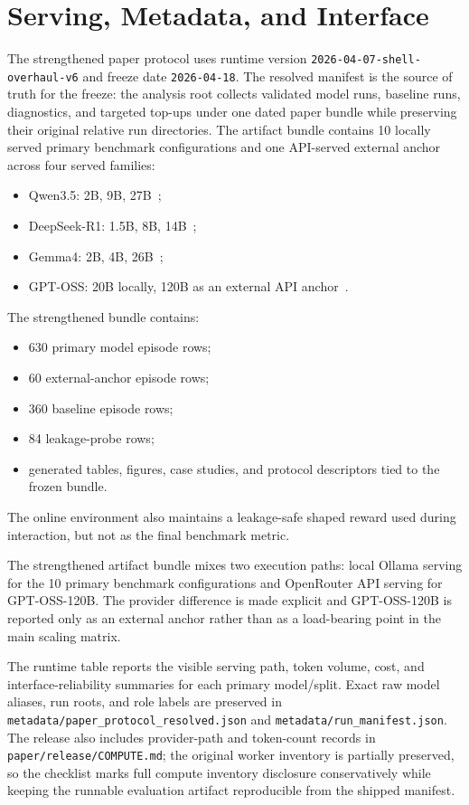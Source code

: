 \section{Serving, Metadata, and Interface}

The strengthened paper protocol uses runtime version
\texttt{2026-04-07-shell-overhaul-v6} and freeze date \texttt{2026-04-18}. The
resolved manifest is the source of truth for the freeze: the analysis root
collects validated model runs, baseline runs, diagnostics, and targeted top-ups
under one dated paper bundle while preserving their original relative run
directories. The artifact bundle contains 10 locally served primary benchmark
configurations and one API-served external anchor across four served families:
\begin{itemize}[leftmargin=1.5em]
  \item Qwen3.5: 2B, 9B, 27B~\citep{qwen3};
  \item DeepSeek-R1: 1.5B, 8B, 14B~\citep{deepseekr1};
  \item Gemma4: 2B, 4B, 26B~\citep{gemma,gemma3};
  \item GPT-OSS: 20B locally, 120B as an external API anchor~\citep{gptoss}.
\end{itemize}

The strengthened bundle contains:
\begin{itemize}[leftmargin=1.5em]
  \item 630 primary model episode rows;
  \item 60 external-anchor episode rows;
  \item 360 baseline episode rows;
  \item 84 leakage-probe rows;
  \item generated tables, figures, case studies, and protocol descriptors tied
  to the frozen bundle.
\end{itemize}

The online environment also maintains a leakage-safe shaped reward used during
interaction, but not as the final benchmark metric.

The strengthened artifact bundle mixes two execution paths: local Ollama
serving for the 10 primary benchmark configurations and OpenRouter API serving
for GPT-OSS-120B. The provider difference is made explicit and GPT-OSS-120B is
reported only as an external anchor rather than as a load-bearing point in the
main scaling matrix.



The runtime table reports the visible serving path, token volume, cost, and
interface-reliability summaries for each primary model/split. Exact raw model
aliases, run roots, and role labels are preserved in
\texttt{metadata/paper\_protocol\_resolved.json} and
\texttt{metadata/run\_manifest.json}. The release also includes provider-path
and token-count records in \texttt{paper/release/COMPUTE.md}; the original
worker inventory is partially preserved, so the checklist marks full compute
inventory disclosure conservatively while keeping the runnable evaluation
artifact reproducible from the shipped manifest.

